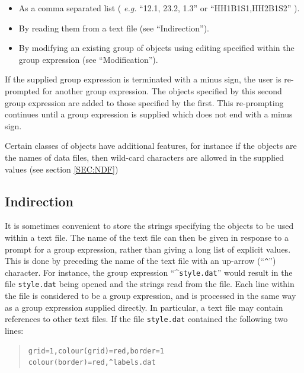 \documentclass[twoside,11pt]{article}
\newcommand{\hyperref}[4]{#2\ref{#4}#3}
\newcommand{\htmlref}[2]{#1}
\renewcommand{\_}{\texttt{\symbol{95}}}
\newenvironment{myquote}{\begin{quote}\begin{small}}{\end{small}\end{quote}}
\begin{document}
\begin{itemize}
\item As a comma separated list ( \emph{e.g.} ``12.1, 23.2, 1.3''
     or ``HH1\_B1S1,HH2\_B1S2'' ). 

\item By reading them from a text file (see
     ``\htmlref{Indirection}{SEC:IND}'').

\item By modifying an existing group of objects using editing 
     specified within the group expression (see
     ``\htmlref{Modification}{SEC:MOD}'').
\end{itemize}

If the supplied group expression is terminated with a minus
sign, the user is re-prompted for another group expression. The
objects specified by this second group expression are added to
those specified by the first. This re-prompting continues until
a group expression is supplied which does not end with a minus
sign. 

Certain classes of objects have additional features, for 
instance if the objects are the names of data files, then wild-card characters 
are allowed in the supplied values (see \hyperref{here}{section }{}{SEC:NDF}) 

\subsection{\label{SEC:IND}Indirection}
It is sometimes convenient to store the strings specifying the objects to
be used within a text file. The name of the text file can then be given
in response to a prompt for a group expression, rather than giving a long
list of explicit values. This is done by preceding the name of the text
file with an up-arrow (``\verb+^+'') character. For instance, the group
expression ``\^{}\verb+style.dat+'' would result in the file
\verb+style.dat+ being opened and the strings read from the file. Each
line within the file is considered to be a group expression, and is
processed in the same way as a group expression supplied directly. In
particular, a text file may contain references to other text files. If
the file
\verb+style.dat+ contained the following two lines:

\begin{myquote}
\begin{verbatim}
grid=1,colour(grid)=red,border=1
colour(border)=red,^labels.dat
\end{verbatim}
\end{myquote}
\end{document}
